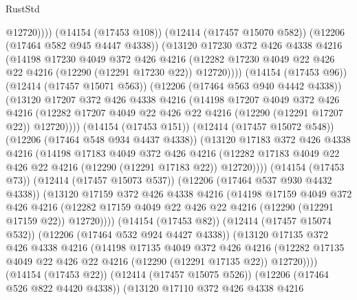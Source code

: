 \begin{lexlean}{RustStd}
\begin{coremodule}
{\begin{coremodule}
{{{{{{{{{{{{{{{{{{{{{{{{{{{{{{{{{{{{{{{{{{{{{{{{{{                        @12720))))
                (@14154 (@17453 @108))
                (@12414 (@17457 @15070 @582))
                (@12206 (@17464 @582 @945 @4447 @4338))
                (@13120
                  @17230
                  @372
                  @426
                  @4338
                  @4216
                  (@14198
                    @17230
                    @4049
                    @372
                    @426
                    @4216
                    (@12282 @17230 @4049 @22 @426 @22 @4216 (@12290 (@12291 @17230 @22)) @12720))))
              (@14154 (@17453 @96))
              (@12414 (@17457 @15071 @563))
              (@12206 (@17464 @563 @940 @4442 @4338))
              (@13120
                @17207
                @372
                @426
                @4338
                @4216
                (@14198
                  @17207
                  @4049
                  @372
                  @426
                  @4216
                  (@12282 @17207 @4049 @22 @426 @22 @4216 (@12290 (@12291 @17207 @22)) @12720))))
            (@14154 (@17453 @151))
            (@12414 (@17457 @15072 @548))
            (@12206 (@17464 @548 @934 @4437 @4338))
            (@13120
              @17183
              @372
              @426
              @4338
              @4216
              (@14198
                @17183
                @4049
                @372
                @426
                @4216
                (@12282 @17183 @4049 @22 @426 @22 @4216 (@12290 (@12291 @17183 @22)) @12720))))
          (@14154 (@17453 @73))
          (@12414 (@17457 @15073 @537))
          (@12206 (@17464 @537 @930 @4432 @4338))
          (@13120
            @17159
            @372
            @426
            @4338
            @4216
            (@14198
              @17159
              @4049
              @372
              @426
              @4216
              (@12282 @17159 @4049 @22 @426 @22 @4216 (@12290 (@12291 @17159 @22)) @12720))))
        (@14154 (@17453 @82))
        (@12414 (@17457 @15074 @532))
        (@12206 (@17464 @532 @924 @4427 @4338))
        (@13120
          @17135
          @372
          @426
          @4338
          @4216
          (@14198
            @17135
            @4049
            @372
            @426
            @4216
            (@12282 @17135 @4049 @22 @426 @22 @4216 (@12290 (@12291 @17135 @22)) @12720))))
      (@14154 (@17453 @22))
      (@12414 (@17457 @15075 @526))
      (@12206 (@17464 @526 @822 @4420 @4338))
      (@13120
        @17110
        @372
        @426
        @4338
        @4216
}}}}}}}}}}}}}}}}}}}}}}}}}}}}}}}}}}}}}}}}}}}}}}}}}}
\end{coremodule}}
\end{coremodule}
\end{lexlean}
